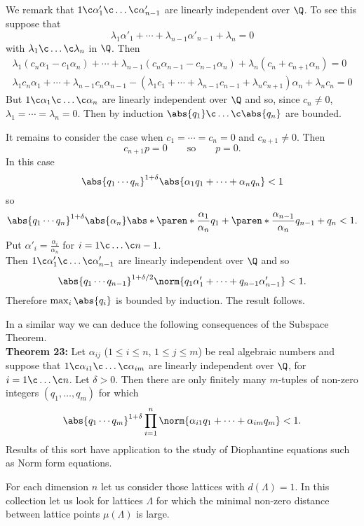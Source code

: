 We remark that $1\c \alpha'_1\c \dotsc\c \alpha'_{n-1}$ are linearly independent over $\Q$.  To see this suppose that
\[ \lambda_1\alpha'_1 + \dotsb + \lambda_{n-1}\alpha'_{n-1} + \lambda_n = 0 \]
with $\lambda_1\c \dotsc\c \lambda_n$ in $\Q$.  Then
\begin{gather*}
\lambda_1(c_n\alpha_1-c_1\alpha_n) + \dotsb + \lambda_{n-1}(c_n\alpha_{n-1}-c_{n-1}\alpha_n) + \lambda_n(c_n+c_{n+1}\alpha_n) = 0 \\
\lambda_1c_n\alpha_1+\dotsb+\lambda_{n-1}c_n\alpha_{n-1}-(\lambda_1c_1+\dotsb+\lambda_{n-1}c_{n-1}+\lambda_nc_{n+1})\alpha_n+\lambda_nc_n = 0
\end{gather*}
But $1\c \alpha_1\c \dotsc\c \alpha_n$ are linearly independent over $\Q$ and so, since $c_n\neq0$, $\lambda_1=\dotsb=\lambda_n=0$.  Then by induction $\abs{q_1}\c \dotsc\c \abs{q_n}$ are bounded.

It remains to consider the case when $c_1=\dotsb=c_n=0$ and $c_{n+1}\neq0$.  Then
\[ c_{n+1}p=0 \qquad\text{so}\qquad p=0 . \]
In this case
\[ \abs{q_1\dotsm q_n}^{1+\delta}\abs{\alpha_1q_1+\dotsb+\alpha_nq_n}<1 \]
so
\[ \abs{q_1\dotsm q_n}^{1+\delta}\abs{\alpha_n}\abs*{\paren*{\frac{\alpha_1}{\alpha_n}}q_1 + \paren*{\frac{\alpha_{n-1}}{\alpha_n}}q_{n-1} + q_n}<1 . \]
Put $\alpha'_i = \frac{\alpha_i}{\alpha_n}$ for $i=1\c \dotsc\c n-1$. \\
Then $1\c \alpha'_1\c \dotsc\c \alpha'_{n-1}$ are linearly independent over $\Q$ and so
\[ \abs{q_1\dotsm q_{n-1}}^{1+\delta/2} \norm{q_1\alpha'_1+\dotsb+q_{n-1}\alpha'_{n-1}} < 1 . \]
Therefore $\max_i\abs{q_i}$ is bounded by induction.  The result follows.

In a similar way we can deduce the following consequences of the Subspace Theorem. \\
\textbf{Theorem 23:} Let $\alpha_{ij}$ ($1\leq i\leq n$, $1\leq j\leq m$) be real algebraic numbers and suppose that $1\c \alpha_{i1}\c \dotsc\c \alpha_{im}$ are linearly independent over $\Q$, for $i=1\c \dotsc\c n$.  Let $\delta>0$.  Then there are only finitely many $m$-tuples of non-zero integers $(q_1,\dotsc,q_m)$ for which
\[ \abs{q_1\dotsm q_m}^{1+\delta} \prod_{i=1}^n \norm{\alpha_{i1}q_1+\dotsb+\alpha_{im}q_m} < 1 . \]
Results of this sort have application to the study of Diophantine equations such as Norm form equations.

For each dimension $n$ let us consider those lattices with $d(\Lambda)=1$.  In this collection let us look for lattices $\Lambda$ for which the minimal non-zero distance between lattice points $\mu(\Lambda)$ is large.


